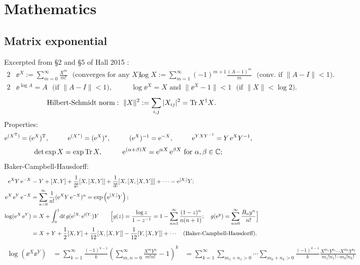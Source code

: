 \documentclass[CheatSheet]{subfiles}
\begin{document}
\detailstyle
\section{Mathematics}
\subsection{Matrix exponential}
Excerpted from \S2 and \S5 of Hall 2015 \cite{hall2015}:
\begin{alignat}{2}
 &\ee^X := \sum_{m=0}^\infty \frac{X^m}{m!} \text{~~(converges for any $X$)},
\quad&
 &\log X := \sum_{m=1}^\infty (-1)^{m+1}\frac{(A-1)^m}{m} \text{~~(conv.~if $\|A-I\|<1$)}.
\end{alignat}
\begin{alignat}{2}
 &\ee^{\log A} = A \text{~~(if $\|A-I\|<1$)},
\quad&
 &\log \ee^X = X \text{~and~} \|\ee^X-1\| < 1 \text{~~(if $\|X\|<\log2$).}
\end{alignat}
\begin{equation}
 \text{Hilbert-Schmidt norm}:~\|X\|^2 := \sum_{i,j}|X_{ij}|^2 = {\operatorname{\mathrm{Tr}} X^\dagger X}.
\end{equation}
Properties:
\begin{alignat*}{4}
 \ee^{(X^\TT)} &= (\ee^X)^\TT,
&\qquad
 \ee^{(X^*)} &= (\ee^X)^*,
&\qquad
 (\ee^X)^{-1} &= \ee^{-X},
&\qquad
 \ee^{YXY^{-1}} &= Y\ee^X Y^{-1},
\end{alignat*}
\begin{alignat*}{2}
 \det \exp X &= \exp\operatorname{\mathrm{Tr}} X,
&\qquad
 \mathop{}\!\mathrm{e}^{(\alpha+\beta)X} &= \mathop{}\!\mathrm{e}^{\alpha X}\mathop{}\!\mathrm{e}^{\beta X} \text{~for $\alpha, \beta\in \mathbb C$};
\end{alignat*}
Baker-Campbell-Hausdorff:
\begin{align}
  \ee^X Y \ee^{-X}
&= Y + [X, Y] + \frac1{2!}[X, [X, Y]] + \frac1{3!}[X, [X, [X, Y]]] + \cdots = \ee^{[X,]}Y;
\\
  \ee^X \ee^Y \ee^{-X}
&= \sum_{n=0}^\infty\frac{1}{n!}(\ee^X Y \ee^{-X})^n
 = \exp\left(\ee^{[X,]}Y\right);
\\
  \log(\ee^X \ee^Y)
&= X + \int_0^1\!\dd t\, g(\ee^{[X,}\ee^{t[Y,})Y
\qquad\Bigl[
  g(z) = \frac{\log z}{1-z^{-1}} = 1-\sum_{n=1}^{\infty}\frac{(1-z)^n}{n(n+1)};
\quad
g(\ee^y)=\sum_{n=0}^{\infty}\frac{B_ny^n}{n!}
\Bigr]\\
&= X + Y + \frac12[X,Y] + \frac1{12}[X, [X,Y]] - \frac1{12}[Y, [X,Y]] + \cdots
\quad\text{(Baker-Campbell-Hausdorff).}
\end{align}
\begin{align}
   \log(\ee^X\ee^Y)
&=\sum_{k=1}^\infty \frac{(-1)^{k-1}}{k}\left(\sum_{m,n=0}^{\infty}\frac{X^mY^n}{m!n!}-1\right)^k
&=\sum_{k=1}^\infty
   \sum_{m_1+n_1>0}\cdots\sum_{m_k+n_k>0}\frac{(-1)^{k-1}}{k}
\frac{X^{m_1}Y^{n_1}\cdots X^{m_k}Y^{n_k}}{m_1!n_1!\cdots m_k!n_k!}
\end{align}
\end{document}
